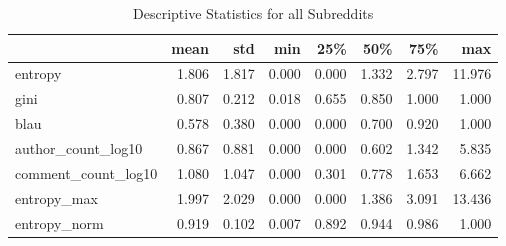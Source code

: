 \begin{table}
\centering
\begin{tabular}{lrrrrrrr}
\toprule
{} &  mean &   std &   min &   25\% &   50\% &   75\% &    max \\
\midrule
entropy             & 1.806 & 1.817 & 0.000 & 0.000 & 1.332 & 2.797 & 11.976 \\
gini                & 0.807 & 0.212 & 0.018 & 0.655 & 0.850 & 1.000 &  1.000 \\
blau                & 0.578 & 0.380 & 0.000 & 0.000 & 0.700 & 0.920 &  1.000 \\
author\_count\_log10  & 0.867 & 0.881 & 0.000 & 0.000 & 0.602 & 1.342 &  5.835 \\
comment\_count\_log10 & 1.080 & 1.047 & 0.000 & 0.301 & 0.778 & 1.653 &  6.662 \\
entropy\_max         & 1.997 & 2.029 & 0.000 & 0.000 & 1.386 & 3.091 & 13.436 \\
entropy\_norm        & 0.919 & 0.102 & 0.007 & 0.892 & 0.944 & 0.986 &  1.000 \\
\bottomrule
\end{tabular}
\caption{Descriptive Statistics for all Subreddits}
\label{table/all}
\end{table}